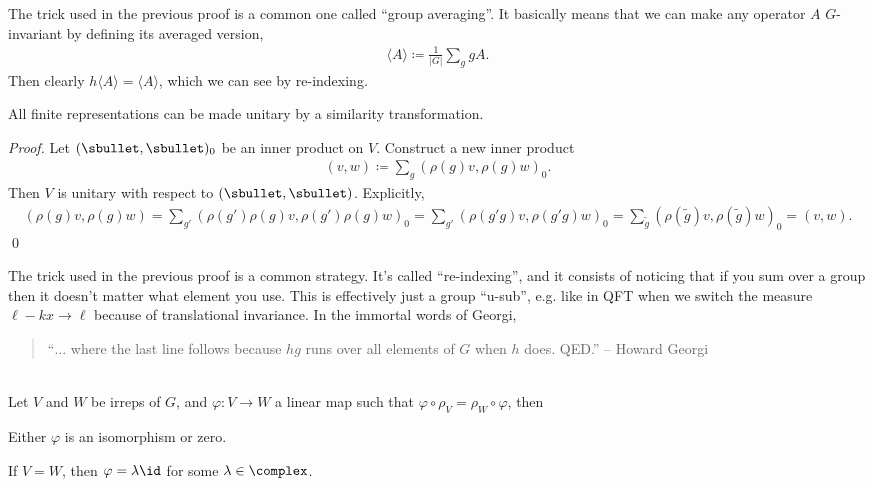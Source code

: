 \documentclass[11pt]{article}
\begin{document}
\begin{nnote}
    The trick used in the previous proof is a common one called
    ``group averaging''. It basically means that we can make any
    operator $A$ $G$-invariant by defining its averaged version,
    \begin{align*}
        \langle A \rangle \coloneqq \frac{1}{|G|} \sum_g g A.
    \end{align*}
    Then clearly $h\langle A \rangle = \langle A \rangle$, which we can see by re-indexing.
\end{nnote}

\begin{theorem}
    All finite representations can be made unitary by a similarity transformation.
\end{theorem}

\begin{proof}
    Let $(\sbullet, \sbullet)_0$ be an inner product on $V$. Construct a new inner product
    \begin{align*}
        (v, w) \coloneqq \sum_g (\rho(g)v, \rho(g)w)_0.
    \end{align*}
    Then $V$ is unitary with respect to $(\sbullet, \sbullet)$. Explicitly,
    \begin{align*}
        (\rho(g)v, \rho(g)w) = \sum_{g'} (\rho(g')\rho(g)v, \rho(g')\rho(g)w)_0
        = \sum_{g'} (\rho(g'g)v, \rho(g'g)w)_0 = \sum_{\tilde{g}} (\rho(\tilde{g})v, \rho(\tilde{g})w)_0 = (v, w).
    \end{align*}
    \qed
\end{proof}

\begin{nnote}
    The trick used in the previous proof is a common strategy.
    It's called ``re-indexing'', and it consists of
    noticing that if you sum over a group then it doesn't matter what 
    element you use. This is effectively just a group ``u-sub'', e.g. like
    in QFT when we switch the measure $\ell - kx \to \ell$ because of
    translational invariance. In the immortal words of Georgi,
    \begin{quote}
        ``$\ldots$ where the last line follows because $hg$ runs over all
        elements of $G$ when $h$ does. QED.'' -- Howard Georgi
    \end{quote}
\end{nnote}

\begin{theorem}{}\\
    Let $V$ and $W$ be irreps of $G$, and $\varphi \colon V \to W$
    a linear map such that $ \varphi \circ \rho_V = \rho_W \circ \varphi$, 
    then
    \begin{alphamerate}
        \item Either $\varphi$ is an isomorphism or zero.
        \item If $V = W$, then $\varphi = \lambda \id$ for some $\lambda \in \complex$.
    \end{alphamerate}
\end{theorem}
\end{document}
